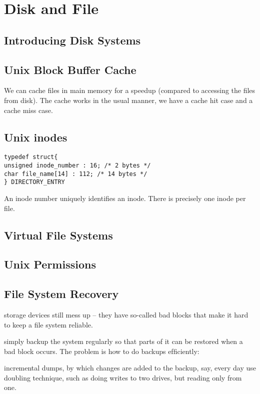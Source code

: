 
\chapter{Disk and File}


\section{Introducing Disk Systems}







\section{Unix Block Buffer Cache}

We can cache files in main memory for a speedup (compared to accessing the files 
from disk). The cache works in the usual manner, we have a cache hit case and a 
cache miss case.



\section{Unix inodes}


\begin{lstlisting}
typedef struct{
unsigned inode_number : 16; /* 2 bytes */
char file_name[14] : 112; /* 14 bytes */
} DIRECTORY_ENTRY
\end{lstlisting}

An inode number uniquely identiﬁes an inode.
There is precisely one inode per ﬁle.

\section{Virtual File Systems}


\section{Unix Permissions}





\section{File System Recovery}

storage devices still mess up – they have
so-called bad blocks that make it hard to keep a ﬁle
system reliable.

simply backup the system regularly so that
parts of it can be restored when a bad block occurs.
The problem is how to do backups efﬁciently:

incremental dumps, by which changes are added
to the backup, say, every day
use doubling technique, such as doing writes to
two drives, but reading only from one.





